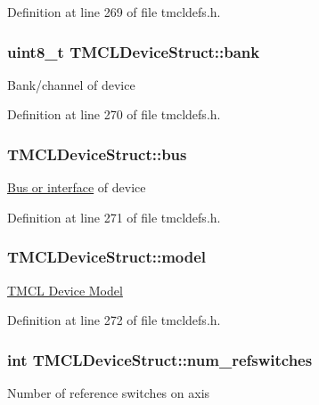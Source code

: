 Definition at line 269 of file tmcldefs.h.\hypertarget{structTMCLDeviceStruct_aa388813983ca862282b187ba8ca70138}{
\subsubsection[{bank}]{\setlength{\rightskip}{0pt plus 5cm}uint8\_\-t {\bf TMCLDeviceStruct::bank}}}
\label{structTMCLDeviceStruct_aa388813983ca862282b187ba8ca70138}
Bank/channel of device 

Definition at line 270 of file tmcldefs.h.\hypertarget{structTMCLDeviceStruct_aa6e5ebc3dd114b186a4ac2276a2dd5a0}{
\subsubsection[{bus}]{ {\bf TMCLDeviceStruct::bus}}}
\label{structTMCLDeviceStruct_aa6e5ebc3dd114b186a4ac2276a2dd5a0}
\hyperlink{tmcldefs_8h_ad26e4e286a55d7c739fd473d8cdd882e}{Bus or interface} of device 

Definition at line 271 of file tmcldefs.h.\hypertarget{structTMCLDeviceStruct_a3c710b5d01b3070e5971614d51ff91ff}{
\subsubsection[{model}]{ {\bf TMCLDeviceStruct::model}}}
\label{structTMCLDeviceStruct_a3c710b5d01b3070e5971614d51ff91ff}
\hyperlink{tmcldefs_8h_a35c090090de43d9850d0f573f7d29e45}{TMCL Device Model} 

Definition at line 272 of file tmcldefs.h.\hypertarget{structTMCLDeviceStruct_a5988d034898432c253ca780b971b4165}{
\subsubsection[{num\_\-refswitches}]{\setlength{\rightskip}{0pt plus 5cm}int {\bf TMCLDeviceStruct::num\_\-refswitches}}}
\label{structTMCLDeviceStruct_a5988d034898432c253ca780b971b4165}
Number of reference switches on axis 

